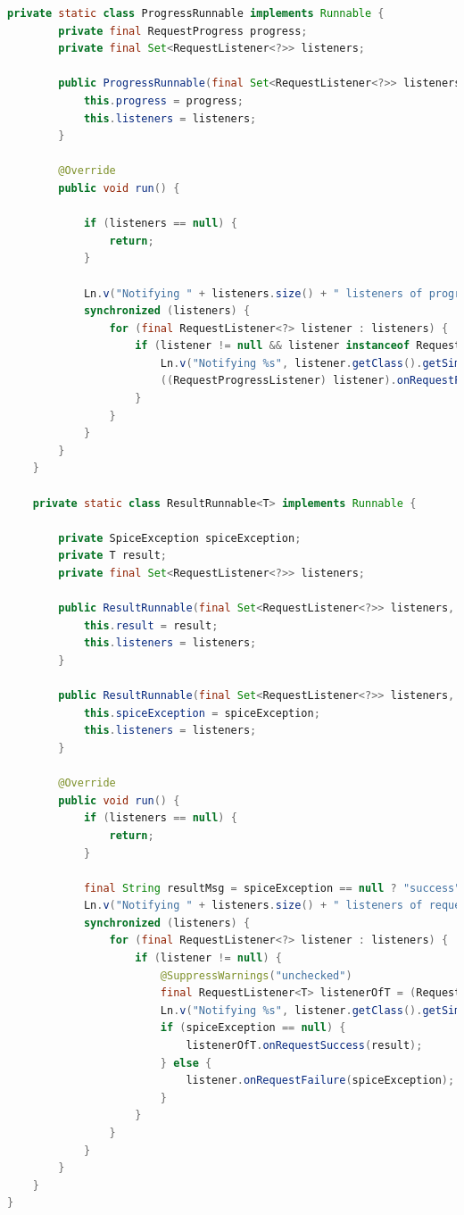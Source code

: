 \begin{lstlisting}[language=java]
    private static class ProgressRunnable implements Runnable {
        private final RequestProgress progress;
        private final Set<RequestListener<?>> listeners;

        public ProgressRunnable(final Set<RequestListener<?>> listeners, final RequestProgress progress) {
            this.progress = progress;
            this.listeners = listeners;
        }

        @Override
        public void run() {

            if (listeners == null) {
                return;
            }

            Ln.v("Notifying " + listeners.size() + " listeners of progress " + progress);
            synchronized (listeners) {
                for (final RequestListener<?> listener : listeners) {
                    if (listener != null && listener instanceof RequestProgressListener) {
                        Ln.v("Notifying %s", listener.getClass().getSimpleName());
                        ((RequestProgressListener) listener).onRequestProgressUpdate(progress);
                    }
                }
            }
        }
    }

    private static class ResultRunnable<T> implements Runnable {

        private SpiceException spiceException;
        private T result;
        private final Set<RequestListener<?>> listeners;

        public ResultRunnable(final Set<RequestListener<?>> listeners, final T result) {
            this.result = result;
            this.listeners = listeners;
        }

        public ResultRunnable(final Set<RequestListener<?>> listeners, final SpiceException spiceException) {
            this.spiceException = spiceException;
            this.listeners = listeners;
        }

        @Override
        public void run() {
            if (listeners == null) {
                return;
            }

            final String resultMsg = spiceException == null ? "success" : "failure";
            Ln.v("Notifying " + listeners.size() + " listeners of request " + resultMsg);
            synchronized (listeners) {
                for (final RequestListener<?> listener : listeners) {
                    if (listener != null) {
                        @SuppressWarnings("unchecked")
                        final RequestListener<T> listenerOfT = (RequestListener<T>) listener;
                        Ln.v("Notifying %s", listener.getClass().getSimpleName());
                        if (spiceException == null) {
                            listenerOfT.onRequestSuccess(result);
                        } else {
                            listener.onRequestFailure(spiceException);
                        }
                    }
                }
            }
        }
    }
}
\end{lstlisting}

